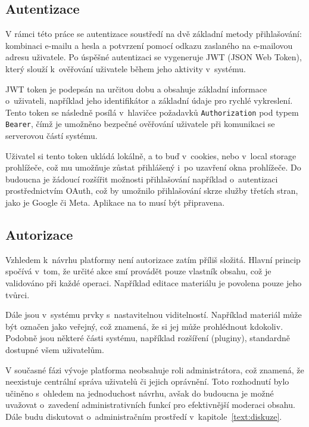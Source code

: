 \subsection{Autentizace}

V rámci této práce se autentizace soustředí na dvě základní metody přihlašování: kombinaci e-mailu a hesla a potvrzení pomocí odkazu zaslaného na e-mailovou adresu uživatele. 
Po úspěšné autentizaci se vygeneruje JWT (JSON Web Token), který slouží k~ověřování uživatele během jeho aktivity v~systému.

JWT token je podepsán na určitou dobu a obsahuje základní informace o~uživateli, například jeho identifikátor a základní údaje pro rychlé vykreslení. 
Tento token se následně posílá v~hlavičce požadavků \texttt{Authorization} pod typem \texttt{Bearer}, čímž je umožněno bezpečné ověřování uživatele při komunikaci se serverovou částí systému.

Uživatel si tento token ukládá lokálně, a to buď v~cookies, nebo v~local storage prohlížeče, což mu umožňuje zůstat přihlášený i~po uzavření okna prohlížeče. 
Do budoucna je žádoucí rozšířit možnosti přihlašování například o~autentizaci prostřednictvím OAuth, což by umožnilo přihlašování skrze služby třetích stran, jako je Google či Meta.
Aplikace na to musí být připravena.

\subsection{Autorizace}

Vzhledem k~návrhu platformy není autorizace zatím příliš složitá. 
Hlavní princip spočívá v~tom, že určité akce smí provádět pouze vlastník obsahu, což je validováno při každé operaci.
Například editace materiálu je povolena pouze jeho tvůrci. 

Dále jsou v~systému prvky s~nastavitelnou viditelností. 
Například materiál může být označen jako veřejný, což znamená, že si jej může prohlédnout kdokoliv. 
Podobně jsou některé části systému, například rozšíření (pluginy), standardně dostupné všem uživatelům.

V současné fázi vývoje platforma neobsahuje roli administrátora, což znamená, že neexistuje centrální správa uživatelů či jejich oprávnění. 
Toto rozhodnutí bylo učiněno s~ohledem na jednoduchost návrhu, avšak do budoucna je možné uvažovat o~zavedení administrativních funkcí pro efektivnější moderaci obsahu.
Dále budu diskutovat o~administračním prostředí v~kapitole~\ref{text:diskuze}.